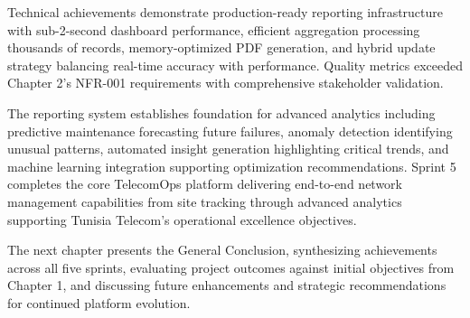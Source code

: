 Technical achievements demonstrate production-ready reporting infrastructure with sub-2-second dashboard performance, efficient aggregation processing thousands of records, memory-optimized PDF generation, and hybrid update strategy balancing real-time accuracy with performance. Quality metrics exceeded Chapter 2's NFR-001 requirements with comprehensive stakeholder validation.

The reporting system establishes foundation for advanced analytics including predictive maintenance forecasting future failures, anomaly detection identifying unusual patterns, automated insight generation highlighting critical trends, and machine learning integration supporting optimization recommendations. Sprint 5 completes the core TelecomOps platform delivering end-to-end network management capabilities from site tracking through advanced analytics supporting Tunisia Telecom's operational excellence objectives.

The next chapter presents the General Conclusion, synthesizing achievements across all five sprints, evaluating project outcomes against initial objectives from Chapter 1, and discussing future enhancements and strategic recommendations for continued platform evolution.
